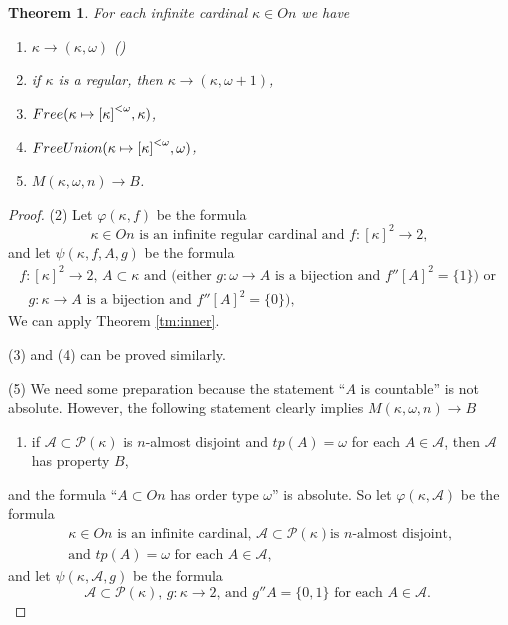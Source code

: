 \documentclass[a4paper,10pt,reqno]{amsart}
\numberwithin{equation}{section}
\newtheorem{theorem}{Theorem}[section]
\theoremstyle{definition}
\theoremstyle{remark}
\newcommand{\mc}[1]{\mathcal{#1}}
\newcommand{\subs}{\subset}
\begin{document}
\begin{theorem}\label{tm:zf-model}
    For each  infinite cardinal ${\kappa}\in On $ we have 
    \begin{enumerate}[(1)]

    \item ${\kappa}\to ({\kappa},{\omega})$
    (\cite[Example 1]{Ka14})\smallskip
\item if ${\kappa}$ is a regular, then 
${\kappa}\to ({\kappa},{\omega}+1)$, \smallskip
    \item 
    $Free({\kappa}\mapsto {[{\kappa}]}^{<{\omega}}, {\kappa})$, \smallskip 
    \item $FreeUnion({\kappa}\mapsto {[{\kappa}]}^{<{\omega}}, {\omega})$, \smallskip
    \item\label{en:B}  $M({\kappa},{\omega},n)\to B$. \smallskip
\end{enumerate}

\end{theorem}


\begin{proof}
(2) Let ${\varphi}({\kappa},f)$ be the formula 
\begin{displaymath}
\text{${\kappa}\in On$ is an infinite regular cardinal and $f:{[{\kappa}]}^{2}\to 2$},
\end{displaymath}
and let ${\psi}({\kappa},f,A,g)$ be the formula 
\begin{multline*}
\text{$f:{[{\kappa}]}^{2}\to 2$, $A\subs {\kappa}$ and (either $g:{\omega}\to A$ is a bijection and 
$f''[A]^2=\{1\}$) or }\\
\text{ $g:{\kappa}\to A$ is a bijection and 
$f''[A]^2=\{0\}$)},
\end{multline*}
We can apply Theorem \ref{tm:inner}.

\noindent (3) and (4) can be proved similarly. 

\noindent (5)
We need some preparation because the statement 
``$A$ is countable'' is not absolute. However,  the following statement clearly 
implies $M({\kappa},{\omega},n)\to B$
\begin{enumerate}[(*)]
\item if $\mc A\subs \mc P({\kappa})$ is $n$-almost disjoint and $tp(A)={\omega}$ for each 
$A\in \mc A$, then $\mc A$ has property $B$,
\end{enumerate}
and the formula ``$A\subs On $ has order type ${\omega}$'' is absolute. 
So let ${\varphi}({\kappa},\mc A)$ be the formula 
\begin{multline*}
\text{${\kappa}\in On$ is an infinite cardinal, $\mc A\subs \mc P({\kappa})$
is $n$-almost disjoint,}\\
\text{and $tp(A)={\omega}$ for each $A\in \mc A$},
\end{multline*}
and let ${\psi}({\kappa},\mc A,g)$ be the formula 
\begin{displaymath}
\text{$\mc A\subs \mc P({\kappa})$, $g:{\kappa}\to 2$,  and 
$g''A=\{0,1\}$ for each $A\in \mc A$.  }
\end{displaymath}
\end{proof}
\end{document}
